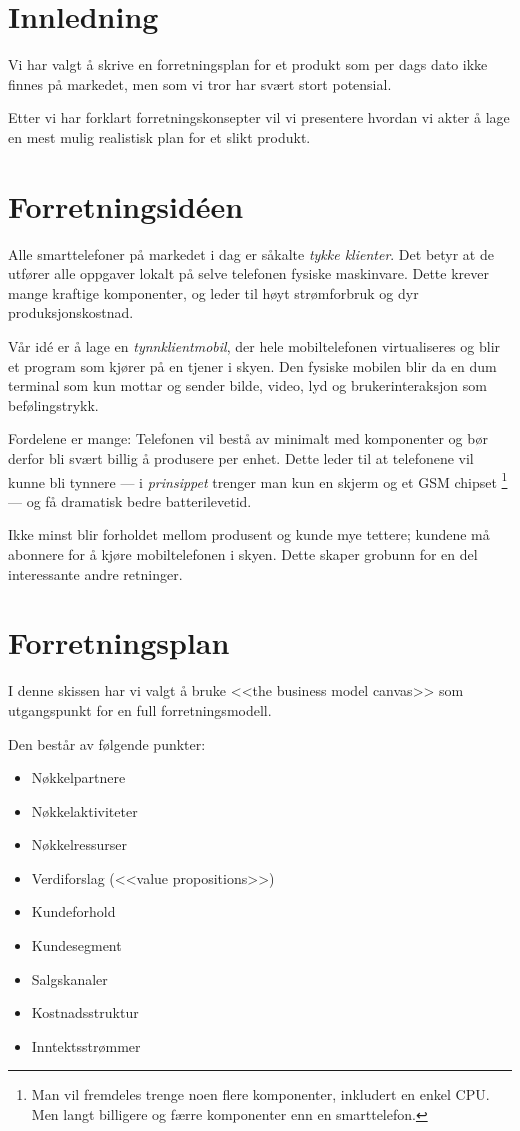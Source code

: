 \section*{Innledning}

Vi har valgt å skrive en forretningsplan for et produkt som per dags dato ikke
finnes på markedet, men som vi tror har svært stort potensial.

Etter vi har forklart forretningskonsepter vil vi presentere hvordan vi akter å
lage en mest mulig realistisk plan for et slikt produkt.

\section*{Forretningsidéen}

Alle smarttelefoner på markedet i dag er såkalte \textit{tykke klienter}. Det
betyr at de utfører alle oppgaver lokalt på selve telefonen fysiske maskinvare.
Dette krever mange kraftige komponenter, og leder til høyt strømforbruk og dyr
produksjonskostnad.

Vår idé er å lage en \textit{tynnklientmobil}, der hele mobiltelefonen
virtualiseres og blir et program som kjører på en tjener i skyen. Den fysiske
mobilen blir da en dum terminal som kun mottar og sender bilde, video, lyd og
brukerinteraksjon som befølingstrykk.

Fordelene er mange: Telefonen vil bestå av minimalt med komponenter og bør
derfor bli svært billig å produsere per enhet. Dette leder til at telefonene
vil kunne bli tynnere --- i \textit{prinsippet} trenger man kun en skjerm og et
GSM chipset \footnote{Man vil fremdeles trenge noen flere komponenter,
  inkludert en enkel CPU. Men langt billigere og færre komponenter enn en
smarttelefon.} --- og få dramatisk bedre batterilevetid.

Ikke minst blir forholdet mellom produsent og kunde mye tettere; kundene må
abonnere for å kjøre mobiltelefonen i skyen. Dette skaper grobunn for en del
interessante andre retninger.

\section*{Forretningsplan}

I denne skissen har vi valgt å bruke <<the business model canvas>>
\cite{oswalder} som utgangspunkt for en full forretningsmodell.

Den består av følgende punkter:

\begin{itemize}
  \item Nøkkelpartnere
  \item Nøkkelaktiviteter
  \item Nøkkelressurser
  \item Verdiforslag (<<value propositions>>)
  \item Kundeforhold
  \item Kundesegment
  \item Salgskanaler
  \item Kostnadsstruktur
  \item Inntektsstrømmer
\end{itemize}

